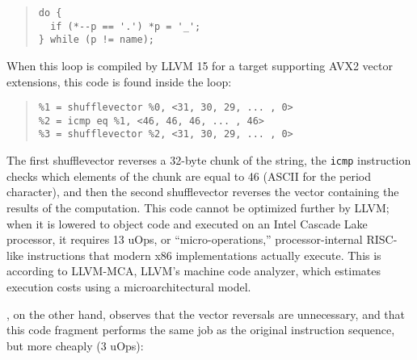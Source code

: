 {\small\begin{quote}
\begin{verbatim}
do {
  if (*--p == '.') *p = '_';
} while (p != name);
\end{verbatim}
\end{quote}}

When this loop is compiled by LLVM 15 for a target supporting AVX2
vector extensions, this code is found inside the loop:


{\small\begin{quote}
\begin{verbatim}
%1 = shufflevector %0, <31, 30, 29, ... , 0>
%2 = icmp eq %1, <46, 46, 46, ... , 46>
%3 = shufflevector %2, <31, 30, 29, ... , 0>
\end{verbatim}
\end{quote}}

The first shufflevector reverses a 32-byte chunk of the string, the
\texttt{icmp} instruction checks which elements of the chunk are equal
to 46 (ASCII for the period character), and then the second
shufflevector reverses the vector containing the results of the
computation.
%
This code cannot be optimized further by LLVM; when it is lowered to
object code and executed on an Intel Cascade Lake processor, it
requires 13 uOps, or ``micro-operations,'' processor-internal
RISC-like instructions that modern x86 implementations actually
execute.
%
This is according to LLVM-MCA, LLVM's machine code analyzer, which
estimates execution costs using a microarchitectural model.


\tool{}, on the other hand, observes that the vector reversals are
unnecessary, and that this code fragment performs the same job as the
original instruction sequence, but more cheaply (3 uOps):


